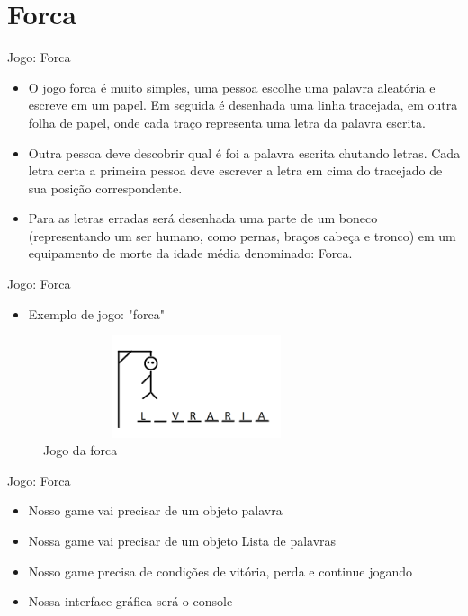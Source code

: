 \section{Forca}

\begin{frame}
	\begin{block}{Jogo: Forca}
		\begin{itemize}
			\item O jogo forca é muito simples, uma pessoa escolhe uma palavra aleatória e escreve em um papel. Em seguida é desenhada uma linha tracejada, em outra folha de papel, onde cada traço representa uma letra da palavra escrita.
			
			\item Outra pessoa deve descobrir qual é foi a palavra escrita chutando letras. Cada letra certa a primeira pessoa deve escrever a letra em cima do tracejado de sua posição correspondente.
			
			\item Para as letras erradas será desenhada uma parte de um boneco (representando um ser humano, como pernas, braços cabeça e tronco) em um equipamento de morte da idade média denominado: Forca.
		\end{itemize}
	\end{block}
\end{frame}

\begin{frame}
	\begin{block}{Jogo: Forca}
		\begin{itemize}
			\item Exemplo de jogo: "forca"
		\end{itemize}
		\begin{figure}[!htb]
			\centering	  				
			\includegraphics[height=3cm, width = 9cm]{./pic/forca.png}
			\caption{Jogo da forca}
			\label{fig_LLS_one}
		\end{figure}
	\end{block}
\end{frame}

\begin{frame}
	\begin{block}{Jogo: Forca}
		\begin{itemize}
			\item Nosso game vai precisar de um objeto palavra

			\item Nossa game vai precisar de um objeto Lista de palavras
		
			\item Nosso game precisa de condições de vitória, perda e continue jogando
		
			\item Nossa interface gráfica será o console
		\end{itemize}
	\end{block}
\end{frame}

